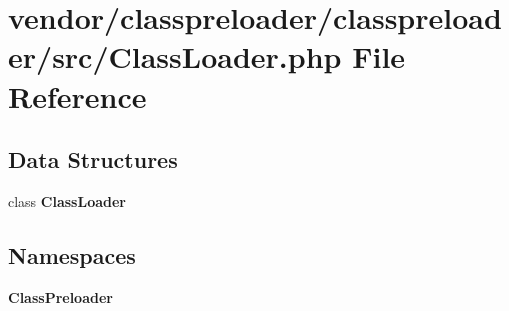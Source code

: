 \section{vendor/classpreloader/classpreloader/src/\+Class\+Loader.php File Reference}
\label{classpreloader_2classpreloader_2src_2_class_loader_8php}
\subsection*{Data Structures}
\begin{DoxyCompactItemize}
\item 
class {\bf Class\+Loader}
\end{DoxyCompactItemize}
\subsection*{Namespaces}
\begin{DoxyCompactItemize}
\item 
 {\bf Class\+Preloader}
\end{DoxyCompactItemize}
